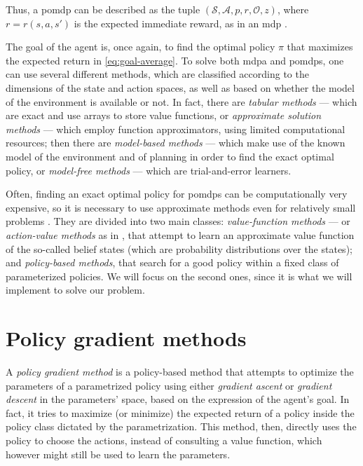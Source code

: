 Thus, a \acrshort{pomdp} can be described as the tuple $(\mathcal S, \mathcal A, p, r, \mathcal O, z)$, where $r = r(s,a,s')$ is the expected immediate reward, as in an \acrshort{mdp} \cite{Kaelbling1998}.

The goal of the agent is, once again, to find the optimal policy $\pi$ that maximizes the expected return in \eqref{eq:goal-average}. To solve both \acrshort{mdp}a and \acrshort{pomdp}s, one can use several different methods, which are classified according to the dimensions of the state and action spaces, as well as based on whether the model of the environment is available or not. In fact, there are \emph{tabular methods} --- which are exact and use arrays to store value functions, or \emph{approximate solution methods} --- which employ function approximators, using limited computational resources; then there are \emph{model-based methods} --- which make use of the known model of the environment and of planning in order to find the exact optimal policy, or \emph{model-free methods} --- which are trial-and-error learners.

Often, finding an exact optimal policy for \acrshort{pomdp}s can be computationally very expensive, so it is necessary to use approximate methods even for relatively small problems \cite{Aberdeen2002ScalingIP}. They are divided into two main classes: \emph{value-function methods} --- or \emph{action-value methods} as in \cite{SuttonBarto}, that attempt to learn an approximate value function of the so-called belief states (which are probability distributions over the states); and \emph{policy-based methods}, that search for a good policy within a fixed class of parameterized policies. We will focus on the second ones, since it is what we will implement to solve our problem.


\section{Policy gradient methods}
\label{sec:pgm}

A \emph{policy gradient method} is a policy-based method that attempts to optimize the parameters of a parametrized policy using either \emph{gradient  ascent} or \emph{gradient descent} in the parameters' space, based on the expression of the agent's goal. In fact, it tries to maximize (or minimize) the expected return of a policy inside the policy class dictated by the parametrization. This method, then, directly uses the policy to choose the actions, instead of consulting a value function, which however might still be used to learn the parameters.

